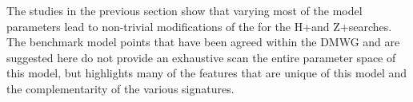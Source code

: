 
%
%
%
%
%
%
%
%
%
%
%


The studies in the previous section show that varying most of the model parameters lead to non-trivial modifications of the for the H+\MET and Z+\MET searches. 
The benchmark model points that have been agreed within the DMWG and are suggested here do not provide an exhaustive scan the entire parameter space of this model, but highlights many of the features that are unique of this model and the complementarity of the various signatures. 

